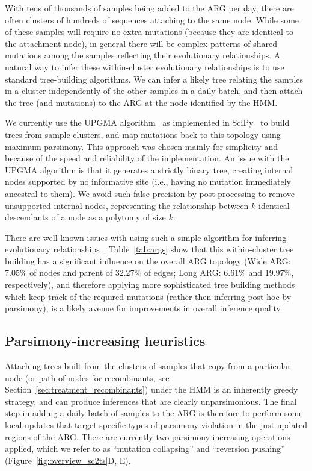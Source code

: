 \documentclass{article}
\begin{document}
With tens of thousands of samples being added to the ARG per day,
there are often clusters of hundreds of sequences attaching to the same node.
While some of these samples will require no extra mutations
(because they are identical to the attachment node), in general there
will be complex patterns of shared mutations among the samples
reflecting their evolutionary relationships. A natural way to infer
these within-cluster evolutionary relationships is to use standard
tree-building algorithms.
We can infer a likely tree relating the
samples in a cluster independently of the other samples in a
daily batch, and then attach the tree (and mutations)
to the ARG at the node identified by the HMM.

We currently use the UPGMA algorithm~\citep{Michener1957-tr}
as implemented in SciPy~\citep{Pauli2020-scipy} to build trees from sample
clusters, and map mutations back to this topology using maximum parsimony.
This approach was chosen mainly for simplicity and because of the
speed and reliability of the implementation.
An issue with the UPGMA algorithm is that it generates a strictly
binary tree, creating internal nodes
supported by no informative site (i.e., having no mutation immediately
ancestral to them). We avoid such false precision by post-processing
to remove unsupported internal nodes, representing the relationship
between $k$ identical descendants of a node as a polytomy of size $k$.

There are well-known issues with using such a simple algorithm for inferring
evolutionary relationships~\citep{Felsenstein2004-inferring}.
Table~\ref{tab:args} show that
this within-cluster tree building has a significant influence on the
overall ARG topology (Wide ARG: 7.05\% of nodes and parent of
32.27\% of edges; Long ARG: 6.61\% and 19.97\%, respectively),
and therefore applying more sophisticated
tree building methods which keep track of the required mutations
(rather then inferring post-hoc by parsimony), is a likely avenue
for improvements in overall inference quality.

\subsection{Parsimony-increasing heuristics}
\label{sec:parsimony-heuristics}
Attaching trees built from the clusters of samples that copy from
a particular node (or path of nodes for recombinants,
see Section~\ref{sec:treatment_recombinants}) under the
HMM is an inherently greedy strategy,
and can produce inferences that are clearly unparsimonious.
The final step in adding a daily batch of samples to the ARG
is therefore to perform some local updates that target specific
types of parsimony violation in the just-updated regions of the
ARG. There are currently two parsimony-increasing operations
applied, which we refer to as ``mutation collapsing'' and ``reversion
pushing'' (Figure~\ref{fig:overview_sc2ts}D, E).
\end{document}
